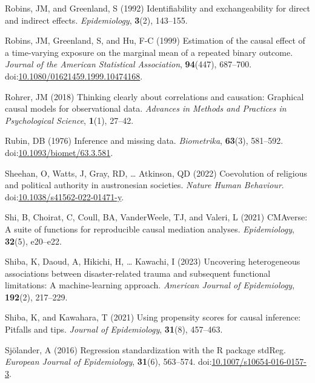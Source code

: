 \documentclass[
  singlecolumn]{article}
\newlength{\cslhangindent}
\newenvironment{CSLReferences}[2] %
 {\begin{list}{}{%
  \setlength{\itemindent}{0pt}
  \setlength{\leftmargin}{0pt}
  \setlength{\parsep}{0pt}
  \ifodd #1
   \setlength{\leftmargin}{\cslhangindent}
   \setlength{\itemindent}{-1\cslhangindent}
  \fi
  \setlength{\itemsep}{#2\baselineskip}}}
 {\end{list}}
\begin{document}
\begin{CSLReferences}{1}{0}
Robins, JM, and Greenland, S (1992) Identifiability and exchangeability
for direct and indirect effects. \emph{Epidemiology}, \textbf{3}(2),
143--155.

Robins, JM, Greenland, S, and Hu, F-C (1999) Estimation of the causal
effect of a time-varying exposure on the marginal mean of a repeated
binary outcome. \emph{Journal of the American Statistical Association},
\textbf{94}(447), 687--700.
doi:\href{https://doi.org/10.1080/01621459.1999.10474168}{10.1080/01621459.1999.10474168}.

Rohrer, JM (2018) Thinking clearly about correlations and causation:
Graphical causal models for observational data. \emph{Advances in
Methods and Practices in Psychological Science}, \textbf{1}(1), 27--42.

Rubin, DB (1976) Inference and missing data. \emph{Biometrika},
\textbf{63}(3), 581--592.
doi:\href{https://doi.org/10.1093/biomet/63.3.581}{10.1093/biomet/63.3.581}.

Sheehan, O, Watts, J, Gray, RD, \ldots{} Atkinson, QD (2022) Coevolution
of religious and political authority in austronesian societies.
\emph{Nature Human Behaviour}.
doi:\href{https://doi.org/10.1038/s41562-022-01471-y}{10.1038/s41562-022-01471-y}.

Shi, B, Choirat, C, Coull, BA, VanderWeele, TJ, and Valeri, L (2021)
CMAverse: A suite of functions for reproducible causal mediation
analyses. \emph{Epidemiology}, \textbf{32}(5), e20--e22.

Shiba, K, Daoud, A, Hikichi, H, \ldots{} Kawachi, I (2023) Uncovering
heterogeneous associations between disaster-related trauma and
subsequent functional limitations: A machine-learning approach.
\emph{American Journal of Epidemiology}, \textbf{192}(2), 217--229.

Shiba, K, and Kawahara, T (2021) Using propensity scores for causal
inference: Pitfalls and tips. \emph{Journal of Epidemiology},
\textbf{31}(8), 457--463.

Sjölander, A (2016) Regression standardization with the R package
stdReg. \emph{European Journal of Epidemiology}, \textbf{31}(6),
563--574.
doi:\href{https://doi.org/10.1007/s10654-016-0157-3}{10.1007/s10654-016-0157-3}.


\end{CSLReferences}
\end{document}
